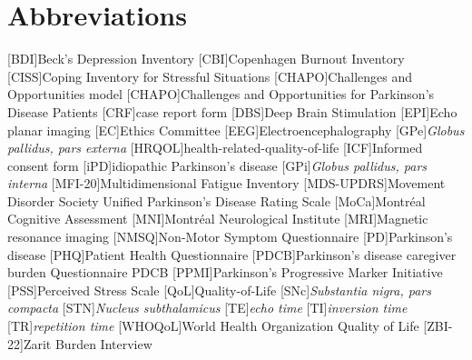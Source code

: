 \chapter*{Abbreviations}
\let\oldbaselinestretch=\baselinestretch%
\renewcommand{\baselinestretch}{1}%
\large\normalsize%
\thispagestyle{plain}
\begin{multicols}{2}
\begin{acronym}
\setlength{\parskip}{0ex}
[BDI]{Beck's Depression Inventory}
[CBI]{Copenhagen Burnout Inventory}
[CISS]{Coping Inventory for Stressful Situations}
[CHAPO]{Challenges and Opportunities model}
[CHAPO]{Challenges and Opportunities for Parkinson's Disease Patients}
[CRF]{case report form}
[DBS]{Deep Brain Stimulation}
[EPI]{Echo planar imaging}
[EC]{Ethics Committee}
[EEG]{Electroencephalography}
[GPe]{\textit{Globus pallidus, pars externa}}
[HRQOL]{health-related-quality-of-life}
[ICF]{Informed consent form}
[iPD]{idiopathic Parkinson's disease}
[GPi]{\textit{Globus pallidus, pars interna}}
[MFI-20]{Multidimensional Fatigue Inventory}
[MDS-UPDRS]{Movement Disorder Society Unified Parkinson's Disease Rating Scale}
[MoCa]{Montréal Cognitive Assessment}
[MNI]{Montréal Neurological Institute}
[MRI]{Magnetic resonance imaging}
[NMSQ]{Non-Motor Symptom Questionnaire}
[PD]{Parkinson's disease}
[PHQ]{Patient Health Questionnaire}
[PDCB]{Parkinson’s disease caregiver burden Questionnaire PDCB}
[PPMI]{Parkinson's Progressive Marker Initiative}
[PSS]{Perceived Stress Scale}
[QoL]{Quality-of-Life}
[SNc]{\textit{Substantia nigra, pars compacta}}
[STN]{\textit{Nucleus subthalamicus}}
[TE]{\textit{echo time}}
[TI]{\textit{inversion time}}
[TR]{\textit{repetition time}}
[WHOQoL]{World Health Organization Quality of Life}
[ZBI-22]{Zarit Burden Interview}
\end{acronym}
\renewcommand{\baselinestretch}{\oldbaselinestretch}%
\large\normalsize%
\end{multicols}
